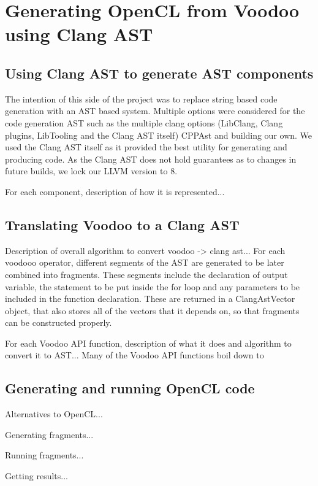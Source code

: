 \section{Generating OpenCL from Voodoo using Clang AST}

\subsection{Using Clang AST to generate AST components}

The intention of this side of the project was to replace string based code generation with an AST based system. Multiple options were considered for the code generation AST such as the multiple clang options (LibClang, Clang plugins, LibTooling and the Clang AST itself) CPPAst and building our own. We used the Clang AST itself as it provided the best utility for generating and producing code. As the Clang AST does not hold guarantees as to changes in future builds, we lock our LLVM version to 8.

For each component, description of how it is represented...

\subsection{Translating Voodoo to a Clang AST}

Description of overall algorithm to convert voodoo -> clang ast...
For each voodooo operator, different segments of the AST are generated to be later combined into fragments. These segments include the declaration of output variable, the statement to be put inside the for loop and any parameters to be included in the function declaration. These are returned in a ClangAstVector object, that also stores all of the vectors that it depends on, so that fragments can be constructed properly. 

For each Voodoo API function, description of what it does and algorithm to convert it to AST...
Many of the Voodoo API functions boil down to 

\subsection{Generating and running OpenCL code}

Alternatives to OpenCL...

Generating fragments...

Running fragments...

Getting results...
